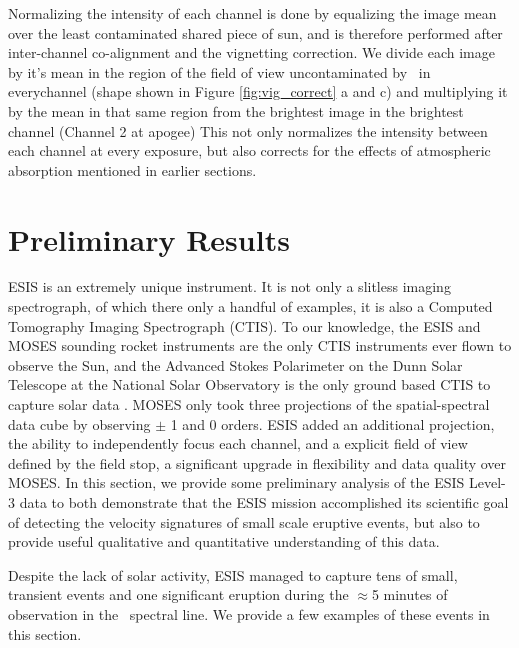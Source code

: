         Normalizing the intensity of each channel is done by equalizing the image mean over the least contaminated shared piece of sun, and is therefore performed after inter-channel co-alignment and the vignetting correction.
        We divide each image by it's mean in the region of the field of view uncontaminated by \mgxbright \ in everychannel (shape shown in Figure \ref{fig:vig_correct} a and c) and multiplying it by the mean in that same region from the brightest image in the brightest channel (Channel 2 at apogee)
        This not only normalizes the intensity between each channel at every exposure, but also corrects for the effects of atmospheric absorption mentioned in earlier sections. 


\section{Preliminary Results}

	   ESIS is an extremely unique instrument.  It is not only a slitless imaging spectrograph, of which there only a handful of examples, it is also a Computed Tomography Imaging Spectrograph (CTIS).  
	   To our knowledge, the ESIS and MOSES sounding rocket instruments are the only CTIS instruments ever flown to observe the Sun, and  the Advanced Stokes Polarimeter on the Dunn Solar Telescope at the National Solar Observatory is the only ground based CTIS to capture solar data \citep{deforest2004}.  
	   MOSES only took three projections of the spatial-spectral data cube by observing $\pm$ 1 and 0 orders.
	   ESIS added an additional projection, the ability to independently focus each channel, and a explicit field of view defined by the field stop, a significant upgrade in flexibility and data quality over MOSES.
	   In this section, we provide some preliminary analysis of the ESIS Level-3 data to both demonstrate that the ESIS mission accomplished its scientific goal of detecting the velocity signatures of small scale eruptive events, but also to provide useful qualitative and quantitative understanding of this data.  
		
	    Despite the lack of solar activity, ESIS managed to capture tens of small, transient events and one significant eruption during the $\approx$5 minutes of observation in the \ov \ spectral line.  
	    We provide a few examples of these events in this section.  
	
